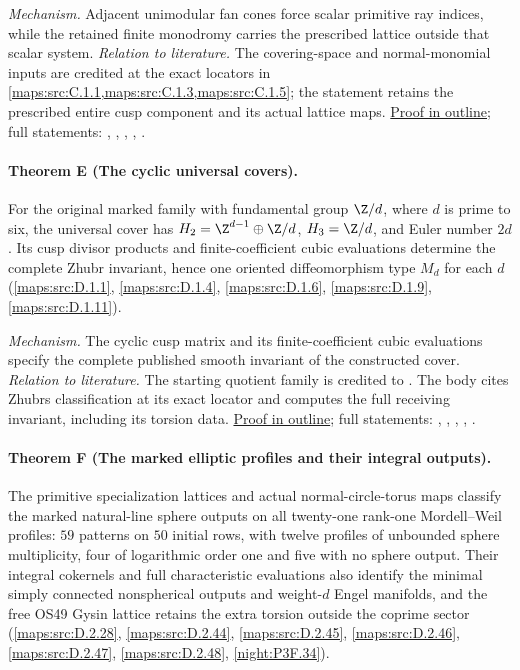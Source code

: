 \textit{Mechanism.} Adjacent unimodular fan cones force scalar primitive ray indices, while the retained finite monodromy carries the prescribed lattice outside that scalar system.
\textit{Relation to literature.} The covering-space and normal-monomial inputs are credited at the exact locators in \cref{maps:src:C.1.1,maps:src:C.1.3,maps:src:C.1.5}; the statement retains the prescribed entire cusp component and its actual lattice maps.
\hyperlink{outline-III-D}{Proof in outline}; full statements: , , , , .

\hypertarget{main-III-E}{}
\paragraph{Theorem E (The cyclic universal covers).}
\label{series:III:E}
For the original marked family with fundamental group
$\Z/d$, where $d$ is prime to six, the universal cover has
$H_2=\Z^{d-1}\oplus\Z/d$, $H_3=\Z/d$, and Euler number
$2d$.  Its cusp divisor products and finite-coefficient cubic
evaluations determine the complete Zhubr invariant, hence one
oriented diffeomorphism type $M_d$ for each $d$
(\cref{maps:src:D.1.1}, \cref{maps:src:D.1.4}, \cref{maps:src:D.1.6}, \cref{maps:src:D.1.9}, \cref{maps:src:D.1.11}).

\textit{Mechanism.} The cyclic cusp matrix and its finite-coefficient cubic evaluations specify the complete published smooth invariant of the constructed cover.
\textit{Relation to literature.} The starting quotient family is credited to \cite[Theorems~7.17 and 7.22, pp.~57 and 60]{AC26}. The body cites Zhubr\textquotesingle s classification at its exact locator and computes the full receiving invariant, including its torsion data.
\hyperlink{outline-III-E}{Proof in outline}; full statements: , , , , .

\hypertarget{main-III-F}{}
\paragraph{Theorem F (The marked elliptic profiles and their integral outputs).}
\label{series:III:F}
The primitive specialization lattices and actual normal-circle-torus
maps classify the marked natural-line sphere outputs on all
twenty-one rank-one Mordell--Weil profiles: $59$ patterns on $50$
initial rows, with twelve profiles of unbounded sphere multiplicity,
four of logarithmic order one and five with no sphere output.
Their integral cokernels and full characteristic evaluations also
identify the minimal simply connected nonspherical outputs and
weight-$d$ Engel manifolds, and the free OS49 Gysin lattice retains
the extra torsion outside the coprime sector
(\cref{maps:src:D.2.28}, \cref{maps:src:D.2.44}, \cref{maps:src:D.2.45}, \cref{maps:src:D.2.46}, \cref{maps:src:D.2.47}, \cref{maps:src:D.2.48}, \cref{night:P3F.34}).

